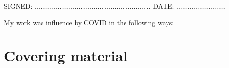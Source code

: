 \documentclass[a4paper, twoside]{templates/ociamthesis}
\begin{document}
\begin{romanpages}
\begin{declaration}
  \begin{flushright}
  SIGNED: .............................................................         DATE: ..........................\\
  \end{flushright}
\end{declaration}

\begin{covidStatment}
 	My work was influence by COVID in the following ways:
\end{covidStatment}

  \dominitoc %

\flushbottom

\tableofcontents

\listoffigures
	\mtcaddchapter

\listoftables
  \mtcaddchapter


\end{romanpages}

\raggedbottom

\hypertarget{covering-material}{%
\chapter*{Covering material}\label{covering-material}}
\end{document}

